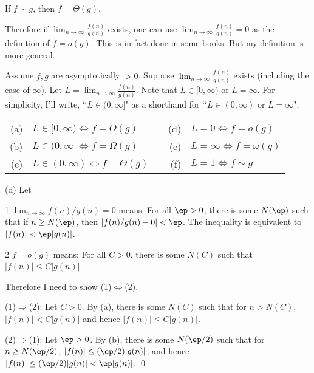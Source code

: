 \begin{prop}
If $f \sim g$, then $f = \Theta(g)$. 
\end{prop}

Therefore if $\displaystyle\lim_{n \rightarrow \infty} \frac{f(n)}{g(n)}$ exists,
one can use $\displaystyle\lim_{n \rightarrow \infty} \frac{f(n)}{g(n)} = 0$ as the
definition of $f = o(g)$.
This is in fact done in some books.
But my definition is more general.

\begin{prop}
Assume $f, g$ are asymptotically $> 0$.
Suppose $\displaystyle \lim_{n \rightarrow \infty} \frac{f(n)}{g(n)}$ exists (including the case of $\infty$).
Let $L = \displaystyle \lim_{n \rightarrow \infty} \frac{f(n)}{g(n)}$.
Note that $L \in [0, \infty)$ or $L = \infty$.
For simplicity, I'll write, \lq\lq $L \in (0, \infty]$" as a shorthand for
\lq\lq $L \in (0, \infty)$ or $L = \infty$".
\begin{longtable}{rlcrl}
\textnormal{(a)} & $L \in [0, \infty) \iff f = O(g)$      & \hspace{1cm} & \textnormal{(d)} & $L = 0 \iff f = o(g)$  \\
\textnormal{(b)} & $L \in (0, \infty] \iff f = \Omega(g)$ & \hspace{1cm} & \textnormal{(e)} & $L = \infty \iff f = \omega(g)$ \\
\textnormal{(c)} & $L \in (0, \infty) \iff f = \Theta(g)$ & \hspace{1cm} & \textnormal{(f)} & $L = 1 \iff f \sim g$
\end{longtable}
\end{prop}
\proof
(d)
Let
\begin{myenum}
\item[1] $\lim_{n\rightarrow \infty} f(n)/g(n) = 0$ means:
  For all $\ep > 0$, there is some $N(\ep)$ such that
if $n \geq N(\ep)$, then $|f(n)/g(n) - 0| < \ep$.
The inequality is equivalent to $|f(n)| < \ep |g(n)|$.
\item[2] $f = o(g)$ means: For all $C > 0$, there is some $N(C)$ such that
$|f(n)| \leq C |g(n)|$.
\end{myenum}
Therefore I need to show (1)$\Longleftrightarrow$(2).

(1)$\Longrightarrow$(2):
Let $C > 0$. By (a), there is some $N(C)$ such that
for $n > N(C)$, $|f(n)| < C|g(n)|$ and hence $|f(n)| \leq C|g(n)|$.

(2)$\Longrightarrow$(1):
Let $\ep > 0$.
By (b), there is some $N(\ep/2)$ such that
for $n \geq N(\ep/2)$, $|f(n)| \leq (\ep/2)|g(n)|$, and hence
$|f(n)| \leq (\ep/2)|g(n)| < \ep |g(n)|$.
\qed

